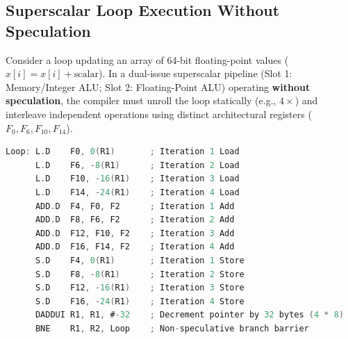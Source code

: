 \subsection{Superscalar Loop Execution Without Speculation}
\label{subsec:unrolling_without_speculation}

Consider a loop updating an array of 64-bit floating-point values ($x[i] = x[i] + \text{scalar}$). In a dual-issue superscalar pipeline (Slot 1: Memory/Integer ALU; Slot 2: Floating-Point ALU) operating \textbf{without speculation}, the compiler must unroll the loop statically (e.g., $4\times$) and interleave independent operations using distinct architectural registers ($F_0, F_6, F_{10}, F_{14}$).

\begin{lstlisting}[language=C, caption={$4\times$ Unrolled Loop without Speculation}]
Loop: L.D    F0, 0(R1)       ; Iteration 1 Load
      L.D    F6, -8(R1)      ; Iteration 2 Load
      L.D    F10, -16(R1)    ; Iteration 3 Load
      L.D    F14, -24(R1)    ; Iteration 4 Load
      ADD.D  F4, F0, F2      ; Iteration 1 Add
      ADD.D  F8, F6, F2      ; Iteration 2 Add
      ADD.D  F12, F10, F2    ; Iteration 3 Add
      ADD.D  F16, F14, F2    ; Iteration 4 Add
      S.D    F4, 0(R1)       ; Iteration 1 Store
      S.D    F8, -8(R1)      ; Iteration 2 Store
      S.D    F12, -16(R1)    ; Iteration 3 Store
      S.D    F16, -24(R1)    ; Iteration 4 Store
      DADDUI R1, R1, #-32    ; Decrement pointer by 32 bytes (4 * 8)
      BNE    R1, R2, Loop    ; Non-speculative branch barrier
\end{lstlisting}


